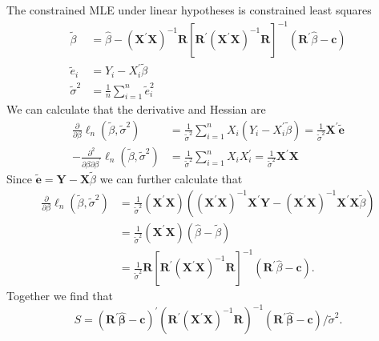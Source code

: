 \documentclass[10pt]{article}
\begin{document}
The constrained MLE under linear hypotheses is constrained least squares
$$
\begin{aligned}
\widetilde{\beta} &=\widehat{\beta}-\left(\boldsymbol{X}^{\prime} \boldsymbol{X}\right)^{-1} \boldsymbol{R}\left[\boldsymbol{R}^{\prime}\left(\boldsymbol{X}^{\prime} \boldsymbol{X}\right)^{-1} \boldsymbol{R}\right]^{-1}\left(\boldsymbol{R}^{\prime} \widehat{\beta}-\boldsymbol{c}\right) \\
\widetilde{e}_{i} &=Y_{i}-X_{i}^{\prime} \widetilde{\beta} \\
\widetilde{\sigma}^{2} &=\frac{1}{n} \sum_{i=1}^{n} \widetilde{e}_{i}^{2}
\end{aligned}
$$
We can calculate that the derivative and Hessian are
$$
\begin{aligned}
\frac{\partial}{\partial \beta} \ell_{n}\left(\widetilde{\beta}, \widetilde{\sigma}^{2}\right) &=\frac{1}{\widetilde{\sigma}^{2}} \sum_{i=1}^{n} X_{i}\left(Y_{i}-X_{i}^{\prime} \widetilde{\beta}\right)=\frac{1}{\widetilde{\sigma}^{2}} \boldsymbol{X}^{\prime} \widetilde{\boldsymbol{e}} \\
-\frac{\partial^{2}}{\partial \beta \partial \beta^{\prime}} \ell_{n}\left(\widetilde{\beta}, \widetilde{\sigma}^{2}\right) &=\frac{1}{\widetilde{\sigma}^{2}} \sum_{i=1}^{n} X_{i} X_{i}^{\prime}=\frac{1}{\widetilde{\sigma}^{2}} \boldsymbol{X}^{\prime} \boldsymbol{X}
\end{aligned}
$$
Since $\widetilde{\boldsymbol{e}}=\boldsymbol{Y}-\boldsymbol{X} \widetilde{\beta}$ we can further calculate that
$$
\begin{aligned}
\frac{\partial}{\partial \beta} \ell_{n}\left(\widetilde{\beta}, \widetilde{\sigma}^{2}\right) &=\frac{1}{\widetilde{\sigma}^{2}}\left(\boldsymbol{X}^{\prime} \boldsymbol{X}\right)\left(\left(\boldsymbol{X}^{\prime} \boldsymbol{X}\right)^{-1} \boldsymbol{X}^{\prime} \boldsymbol{Y}-\left(\boldsymbol{X}^{\prime} \boldsymbol{X}\right)^{-1} \boldsymbol{X}^{\prime} \boldsymbol{X} \widetilde{\beta}\right) \\
&=\frac{1}{\widetilde{\sigma}^{2}}\left(\boldsymbol{X}^{\prime} \boldsymbol{X}\right)(\widehat{\beta}-\widetilde{\beta}) \\
&=\frac{1}{\widetilde{\sigma}^{2}} \boldsymbol{R}\left[\boldsymbol{R}^{\prime}\left(\boldsymbol{X}^{\prime} \boldsymbol{X}\right)^{-1} \boldsymbol{R}\right]^{-1}\left(\boldsymbol{R}^{\prime} \widehat{\beta}-\boldsymbol{c}\right) .
\end{aligned}
$$
Together we find that
$$
S=\left(\boldsymbol{R}^{\prime} \widehat{\boldsymbol{\beta}}-\boldsymbol{c}\right)^{\prime}\left(\boldsymbol{R}^{\prime}\left(\boldsymbol{X}^{\prime} \boldsymbol{X}\right)^{-1} \boldsymbol{R}\right)^{-1}\left(\boldsymbol{R}^{\prime} \widehat{\boldsymbol{\beta}}-\boldsymbol{c}\right) / \widetilde{\sigma}^{2} .
$$
\end{document}
